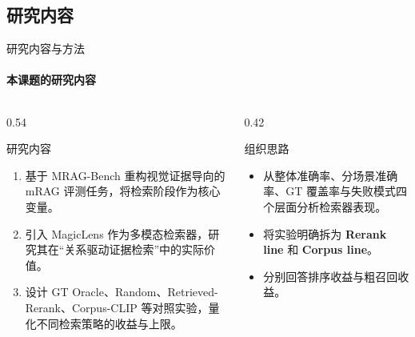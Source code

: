 \documentclass[10pt,aspectratio=169,]{beamer}
\begin{document}
\subsection{研究内容}
\begin{frame}{研究内容与方法}
	\framesubtitle{本课题的研究内容}
	\begin{columns}[T]
		\begin{column}{0.54\textwidth}
			\begin{block}{研究内容}
				\begin{enumerate}
					\item 基于 MRAG-Bench 重构视觉证据导向的 mRAG 评测任务，将检索阶段作为核心变量。
					\item 引入 MagicLens 作为多模态检索器，研究其在“关系驱动证据检索”中的实际价值。
					\item 设计 GT Oracle、Random、Retrieved-Rerank、Corpus-CLIP 等对照实验，量化不同检索策略的收益与上限。
				\end{enumerate}
			\end{block}
		\end{column}
		\begin{column}{0.42\textwidth}
			\begin{alertblock}{组织思路}
				\begin{itemize}
					\item 从整体准确率、分场景准确率、GT 覆盖率与失败模式四个层面分析检索器表现。
					\item 将实验明确拆为 \textbf{Rerank line} 和 \textbf{Corpus line}。
					\item 分别回答排序收益与粗召回收益。
				\end{itemize}
			\end{alertblock}
		\end{column}
	\end{columns}
\end{frame}
\end{document}
